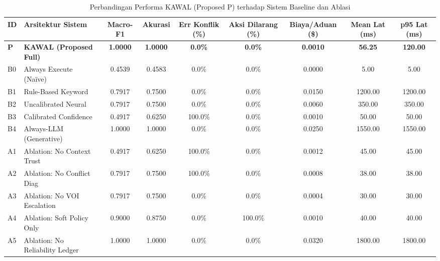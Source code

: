 
\begin{table}[t]
\centering
\caption{Perbandingan Performa KAWAL (Proposed P) terhadap Sistem Baseline dan Ablasi}
\label{tab:system_comparison}
\begin{tabular}{llccccccc}
\toprule
\textbf{ID} & \textbf{Arsitektur Sistem} & \textbf{Macro-F1} & \textbf{Akurasi} & \textbf{Err Konflik (\%)} & \textbf{Aksi Dilarang (\%)} & \textbf{Biaya/Aduan (\$)} & \textbf{Mean Lat (ms)} & \textbf{p95 Lat (ms)} \\
\midrule
\textbf{P} & \textbf{KAWAL (Proposed Full)} & \textbf{1.0000} & \textbf{1.0000} & \textbf{0.0\%} & \textbf{0.0\%} & \textbf{0.0010} & \textbf{56.25} & \textbf{120.00} \\
\midrule
B0 & Always Execute (Naïve) & 0.4539 & 0.4583 & 0.0\% & 0.0\% & 0.0000 & 5.00 & 5.00 \\
B1 & Rule-Based Keyword & 0.7917 & 0.7500 & 0.0\% & 0.0\% & 0.0150 & 1200.00 & 1200.00 \\
B2 & Uncalibrated Neural & 0.7917 & 0.7500 & 0.0\% & 0.0\% & 0.0060 & 350.00 & 350.00 \\
B3 & Calibrated Confidence & 0.4917 & 0.6250 & 100.0\% & 0.0\% & 0.0010 & 50.00 & 50.00 \\
B4 & Always-LLM (Generative) & 1.0000 & 1.0000 & 0.0\% & 0.0\% & 0.0250 & 1550.00 & 1550.00 \\
\midrule
A1 & Ablation: No Context Trust & 0.4917 & 0.6250 & 100.0\% & 0.0\% & 0.0012 & 45.00 & 45.00 \\
A2 & Ablation: No Conflict Diag & 0.7917 & 0.7500 & 100.0\% & 0.0\% & 0.0008 & 38.00 & 38.00 \\
A3 & Ablation: No VOI Escalation & 0.7917 & 0.7500 & 0.0\% & 0.0\% & 0.0004 & 30.00 & 30.00 \\
A4 & Ablation: Soft Policy Only & 0.9000 & 0.8750 & 0.0\% & 100.0\% & 0.0010 & 40.00 & 40.00 \\
A5 & Ablation: No Reliability Ledger & 1.0000 & 1.0000 & 0.0\% & 0.0\% & 0.0320 & 1800.00 & 1800.00 \\
\bottomrule
\end{tabular}
\end{table}


